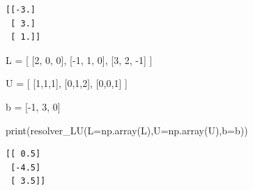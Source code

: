 \documentclass[
  letterpaper,
  DIV=11,
  numbers=noendperiod]{scrartcl}
\newenvironment{Shaded}{\begin{snugshade}}{\end{snugshade}}
\newcommand{\BuiltInTok}[1]{\textcolor[rgb]{0.00,0.23,0.31}{#1}}
\newcommand{\DecValTok}[1]{\textcolor[rgb]{0.68,0.00,0.00}{#1}}
\newcommand{\NormalTok}[1]{\textcolor[rgb]{0.00,0.23,0.31}{#1}}
\newcommand{\OperatorTok}[1]{\textcolor[rgb]{0.37,0.37,0.37}{#1}}
\begin{document}
\begin{verbatim}
[[-3.]
 [ 3.]
 [ 1.]]
\end{verbatim}

\begin{Shaded}
\begin{Highlighting}[]
\NormalTok{L }\OperatorTok{=}\NormalTok{ [}
\NormalTok{    [}\DecValTok{2}\NormalTok{, }\DecValTok{0}\NormalTok{, }\DecValTok{0}\NormalTok{],}
\NormalTok{    [}\OperatorTok{{-}}\DecValTok{1}\NormalTok{, }\DecValTok{1}\NormalTok{, }\DecValTok{0}\NormalTok{],}
\NormalTok{    [}\DecValTok{3}\NormalTok{, }\DecValTok{2}\NormalTok{, }\OperatorTok{{-}}\DecValTok{1}\NormalTok{]}
\NormalTok{]}

\NormalTok{U }\OperatorTok{=}\NormalTok{ [}
\NormalTok{    [}\DecValTok{1}\NormalTok{,}\DecValTok{1}\NormalTok{,}\DecValTok{1}\NormalTok{],}
\NormalTok{    [}\DecValTok{0}\NormalTok{,}\DecValTok{1}\NormalTok{,}\DecValTok{2}\NormalTok{],}
\NormalTok{    [}\DecValTok{0}\NormalTok{,}\DecValTok{0}\NormalTok{,}\DecValTok{1}\NormalTok{]}
\NormalTok{]}

\NormalTok{b }\OperatorTok{=}\NormalTok{ [}\OperatorTok{{-}}\DecValTok{1}\NormalTok{, }\DecValTok{3}\NormalTok{, }\DecValTok{0}\NormalTok{]}

\BuiltInTok{print}\NormalTok{(resolver\_LU(L}\OperatorTok{=}\NormalTok{np.array(L),U}\OperatorTok{=}\NormalTok{np.array(U),b}\OperatorTok{=}\NormalTok{b))}
\end{Highlighting}
\end{Shaded}

\begin{verbatim}
[[ 0.5]
 [-4.5]
 [ 3.5]]
\end{verbatim}
\end{document}
